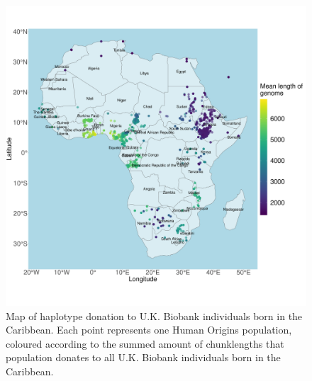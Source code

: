 \begin{figure}[htp]
    \centering
    \includegraphics[width=1.0\textwidth]{../images/appendix/haplotype_map_Caribbean.pdf}
    \caption{Map of haplotype donation to U.K. Biobank individuals born in the Caribbean. Each point represents one Human Origins population, coloured according to the summed amount of chunklengths that population donates to all U.K. Biobank individuals born in the Caribbean.}
    \label{fig:haplotype_map_Caribbean}
\end{figure}

